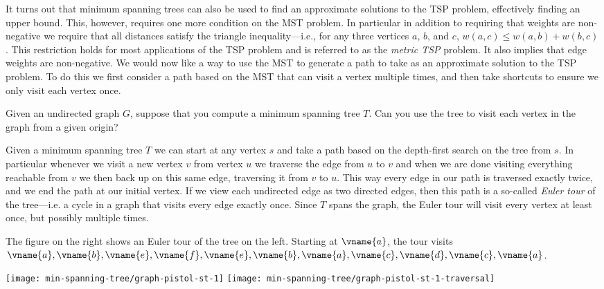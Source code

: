 It turns out that minimum spanning trees can also be used to find an
approximate solutions to the TSP problem, effectively finding an upper
bound.  This, however, requires one more condition on the MST problem.
In particular in addition to requiring that weights are non-negative
we require that all distances satisfy the triangle inequality---i.e.,
for any three vertices $a$, $b$, and $c$, $w(a,c) \leq w(a,b) +
w(b,c)$.  This restriction holds for most applications of the TSP
problem and is referred to as the \emph{metric TSP} problem.  It also
implies that edge weights are non-negative.  We would now like a way
to use the MST to generate a path to take as an approximate solution
to the TSP problem.  To do this we first consider a path
based on the MST that can visit a vertex multiple times, and then take
shortcuts to ensure we only visit each vertex once.
\begin{question}
Given an undirected graph $G$, suppose that you compute a minimum
spanning tree $T$.  Can you use the tree to visit each vertex in the
graph from a given origin?
\end{question}

Given a minimum spanning tree $T$ we can start at any vertex $s$ and
take a path based on the depth-first search on the tree from $s$.  In
particular whenever we visit a new vertex $v$ from vertex $u$ we
traverse the edge from $u$ to $v$ and when we are done visiting
everything reachable from $v$ we then back up on this same edge,
traversing it from $v$ to $u$.  This way every edge in our path is
traversed exactly twice, and we end the path at our initial vertex.
If we view each undirected edge as two directed edges, then this path
is a so-called \emph{Euler tour} of the tree---i.e. a cycle in a graph
that visits every edge exactly once.  Since $T$ spans the graph, the
Euler tour will visit every vertex at least once, but possibly
multiple times.

\begin{example}
The figure on the right shows an Euler tour of the tree on the left.
Starting at $\vname{a}$, the tour visits $\vname{a}, \vname{b},
\vname{e}, \vname{f}, \vname{e}, \vname{b}, \vname{a}, \vname{c},
\vname{d}, \vname{c}, \vname{a}$.

\begin{center}
\texttt{[image: min-spanning-tree/graph-pistol-st-1]}
%
\hspace{1in}
%
\texttt{[image: min-spanning-tree/graph-pistol-st-1-traversal]}
\end{center}
\end{example}

